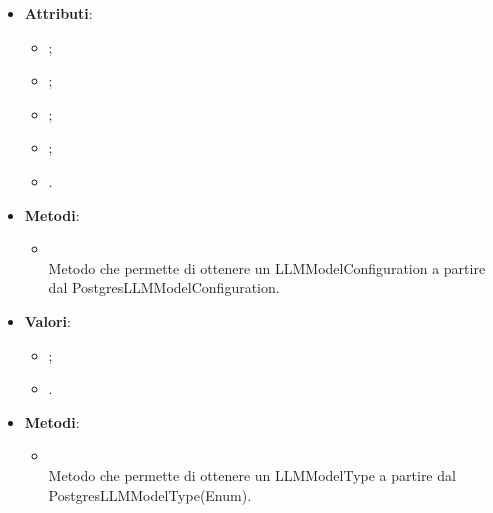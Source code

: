 \documentclass[10pt, a4paper]{article}
\begin{document}
\label{PostgresLLMModelConfigurationDettaglio}
\begin{itemize}
    \item \textbf{Attributi}:
    \begin{itemize}
        \item {};
        \item {};
        \item {};
        \item {};
        \item {}.  
    \end{itemize}
    \item \textbf{Metodi}:
    \begin{itemize}
        \item {}\\ 
        Metodo che permette di ottenere un LLMModelConfiguration a partire dal PostgresLLMModelConfiguration.
    \end{itemize}
\end{itemize}

\label{PostgresLLMModelTypeDettaglio}
\begin{itemize}
    \item \textbf{Valori}:
    \begin{itemize}
        \item {};
        \item {}. 
    \end{itemize}
    \item \textbf{Metodi}:
    \begin{itemize}
        \item {}\\ 
        Metodo che permette di ottenere un LLMModelType a partire dal PostgresLLMModelType(Enum).
    \end{itemize}
\end{itemize}
\end{document}
